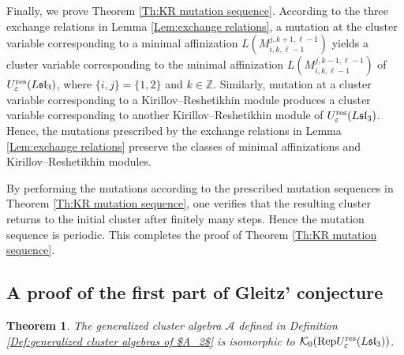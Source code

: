 \documentclass[11pt, reqno]{amsart}
\theoremstyle{plain}
\newtheorem{theorem}{Theorem}[section]
\theoremstyle{definition}
\numberwithin{equation}{section}
\newcommand{\res}{{\rm res}}
\newcommand{\Rep}{{\rm Rep}}
\begin{document}
Finally, we prove Theorem \ref{Th:KR mutation sequence}. According to the three exchange relations in Lemma \ref{Lem:exchange relations}, a mutation at the cluster variable corresponding to a minimal affinization 
$L(M^{j,k+1,\ell-1}_{i,k,\ell-1})$
yields a cluster variable corresponding to the minimal affinization
$L(M^{j,k-1,\ell-1}_{i,k,\ell-1})$
of $U_{\varepsilon}^{\res}(L\mathfrak{sl}_3)$, where $\{i,j\}=\{1,2\}$ and $k\in\mathbb{Z}$.
Similarly, mutation at a cluster variable corresponding to a Kirillov--Reshetikhin module produces a cluster variable corresponding to another Kirillov--Reshetikhin module of $U_{\varepsilon}^{\res}(L\mathfrak{sl}_3)$. Hence, the mutations prescribed by the exchange relations in Lemma \ref{Lem:exchange relations} preserve the classes of minimal affinizations and Kirillov--Reshetikhin modules.

By performing the mutations according to the prescribed mutation sequences in Theorem \ref{Th:KR mutation sequence}, one verifies that the resulting cluster returns to the initial cluster after finitely many steps. Hence the mutation sequence is periodic. This completes the proof of Theorem \ref{Th:KR mutation sequence}.

\subsection{A proof of the first part of Gleitz' conjecture}\label{subsec: proof of isomorphism theorem}

\begin{theorem}\label{Th:isomorphic}
The generalized cluster algebra $\mathcal{A}$ defined in Definition \ref{Def:generalized cluster algebras of $A_2$} is isomorphic to $\mathcal{K}_0(\Rep U_{\varepsilon}^{\res}({L\mathfrak{sl}_{3}}))$.
\end{theorem}
\end{document}
